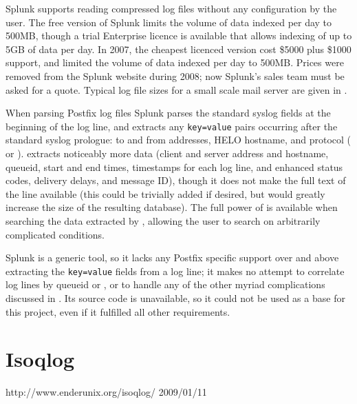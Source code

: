 Splunk supports reading compressed log files without any configuration by
the user.  The free version of Splunk limits the volume of data indexed per
day to 500MB, though a trial Enterprise licence is available that allows
indexing of up to 5GB of data per day.  In 2007, the cheapest licenced
version cost \$5000 plus \$1000 support, and limited the volume of data
indexed per day to 500MB\@.  Prices were removed from the Splunk website
during 2008; now Splunk's sales team must be asked for a quote.  Typical
log file sizes for a small scale mail server are given in
.

When parsing Postfix log files Splunk parses the standard
syslog fields at the beginning of the log line, and extracts
any \texttt{key=value} pairs occurring after the standard syslog prologue:
to and from addresses, HELO hostname, and protocol ( or
).  \parsername{} extracts noticeably more data (client and
server  address and hostname, queueid, start and end times,
timestamps for each log line,  and enhanced status codes,
delivery delays, and message ID), though it does not make the full text of
the line available (this could be trivially added if desired, but would
greatly increase the size of the resulting database).  The full power of
 is available when searching the data extracted by
\parsername{}, allowing the user to search on arbitrarily complicated
conditions.

Splunk is a generic tool, so it lacks any Postfix specific support over and
above extracting the \texttt{key=value} fields from a log line; it makes no
attempt to correlate log lines by queueid or , or to handle
any of the other myriad complications discussed in
.  Its source code is unavailable, so it could
not be used as a base for this project, even if it fulfilled all other
requirements.

\section{Isoqlog}

{http://www.enderunix.org/isoqlog/}
{2009/01/11}

